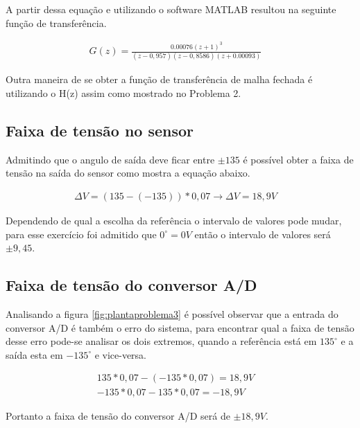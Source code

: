 \documentclass[a4paper,12pt]{article}
\begin{document}
	A partir dessa equação e utilizando o software MATLAB resultou na seguinte função de transferência.
	
	\begin{equation}
		\left.
		\begin{array}{c}
			\displaystyle G(z) = \frac{0.00076(z+1)^3}{(z-0,957)(z-0,8586)(z+0.00093)}
		\end{array}
		\right.
		\quad 
	\end{equation}
	
	Outra maneira de se obter a função de transferência de malha fechada é utilizando o H(z) assim como mostrado no Problema 2.
	
	\subsection{Faixa de tensão no sensor}
		Admitindo que o angulo de saída deve ficar entre $\pm135$ é possível obter a faixa de tensão na saída do sensor como mostra a equação abaixo.
		
		\begin{equation}
			\left.
			\begin{array}{c}
				\displaystyle \Delta V = (135 - (-135)) * 0,07 \rightarrow \Delta V = 18,9V
			\end{array}
			\right.
			\quad 
		\end{equation}
		
		Dependendo de qual a escolha da referência o intervalo de valores pode mudar, para esse exercício foi admitido que $0^\circ = 0V$ então o intervalo de valores será $\pm 9,45$.
		
	\subsection{Faixa de tensão do conversor A/D}
		Analisando a figura \ref{fig:plantaproblema3} é possível observar que a entrada do conversor A/D é também o erro do sistema, para encontrar qual a faixa de tensão desse erro pode-se analisar os dois extremos, quando a referência está em $135^\circ$ e a saída esta em $-135^\circ$  e vice-versa.
		
		
		\begin{equation}
			\left.
			\begin{array}{c}
				\displaystyle 135*0,07 - (-135*0,07) = 18,9V \\[10pt]
				\displaystyle -135*0,07 - 135*0,07 = -18,9V 
			\end{array}
			\right.
			\quad 
		\end{equation}
		
		Portanto a faixa de tensão do conversor A/D será de $\pm18,9V$.
		
\end{document}
